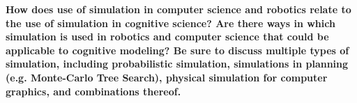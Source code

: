 \documentclass{article}
\begin{document}
\textbf{How does use of simulation in computer science and robotics relate to the use of simulation in cognitive science? Are there ways in which simulation is used in robotics and computer science that could be applicable to cognitive modeling? Be sure to discuss multiple types of simulation, including probabilistic simulation, simulations in planning (e.g. Monte-Carlo Tree Search), physical simulation for computer graphics, and combinations thereof.}
\end{document}
